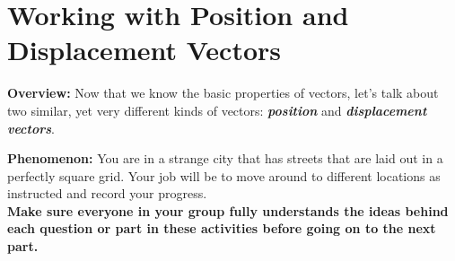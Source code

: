 \section{Working with Position and Displacement Vectors}
\label{act6.1.2}

\begin{overview}

\textbf{Overview:} Now that we know the basic properties of vectors, let's talk about two similar, yet very different kinds of vectors: \textbf{\emph{position}} and \textbf{\emph{displacement vectors}}.

\end{overview}

\noindent\textbf{Phenomenon:} You are in a strange city that has streets that are laid out in a perfectly square grid. Your job will be to move around to different locations as instructed and record your progress.\\

\noindent\textbf{Make sure everyone in your group fully understands the ideas behind each question or part in these activities before going on to the next part.}

